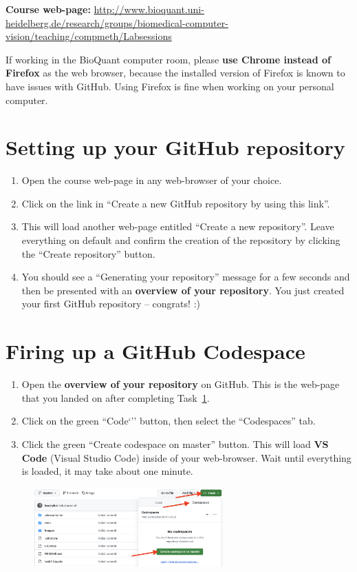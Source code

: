 \documentclass[12pt,a4paper]{article}
\begin{document}
\textbf{Course web-page:} \url{http://www.bioquant.uni-heidelberg.de/research/groups/biomedical-computer-vision/teaching/compmeth/Labsessions}

\vspace{0.5em}
If working in the BioQuant computer room, please \textbf{use Chrome instead of Firefox} as the web browser, because the installed version of Firefox is known to have issues with GitHub. Using Firefox is fine when working on your personal computer.

\section{Setting up your GitHub repository}
\label{task:preparation}
\begin{enumerate}
\item Open the course web-page in any web-browser of your choice.
\item Click on the link in ``Create a new GitHub repository by using this link''.
\item This will load another web-page entitled ``Create a new repository''. Leave everything on default and confirm the creation of the repository by clicking the ``Create repository'' button.
\item You should see a ``Generating your repository'' message for a few seconds and then be presented with an \textbf{overview of your repository}. You just created your first GitHub repository -- congrats! :)
\end{enumerate}

\section{Firing up a GitHub Codespace}
\label{task:codespaces}
\begin{enumerate}
\item Open the \textbf{overview of your repository} on GitHub. This is the web-page that you landed on after completing Task~\ref{task:preparation}.
\item Click on the green ``Code`'' button, then select the ``Codespaces'' tab.
\item Click the green ``Create codespace on master'' button. This will load \textbf{VS Code} (Visual Studio Code) inside of your web-browser. Wait until everything is loaded, it may take about one minute.
\end{enumerate}

\vspace{-1em}
\begin{figure}[h!]
    \centering
    \includegraphics[width=0.65\textwidth]{images/codespaces.png}
\end{figure}
\end{document}
